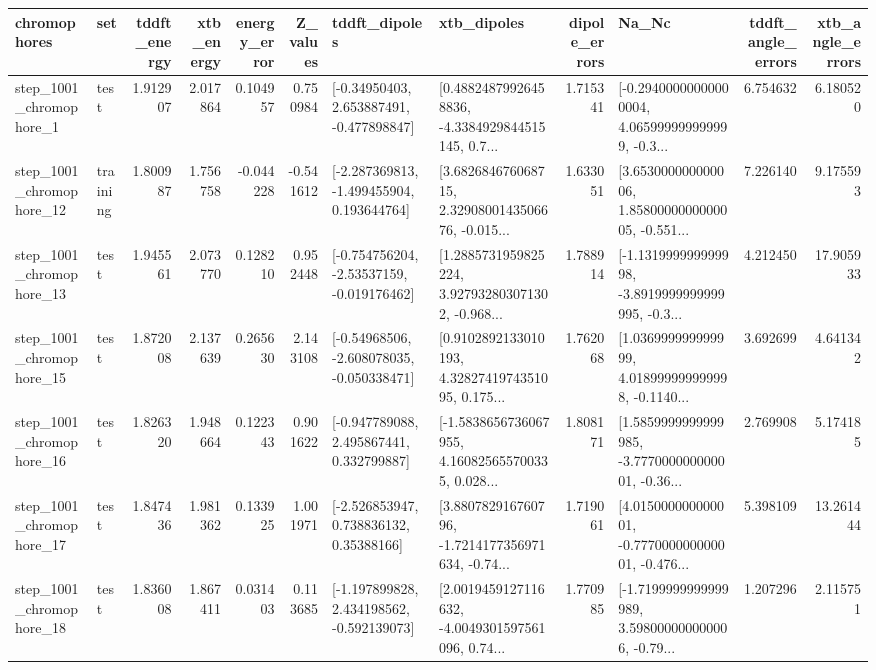 \begin{tabular}{llrrrrllrlrr}
\toprule
             chromophores &       set &  tddft\_energy &  xtb\_energy &  energy\_error &  Z\_values &                               tddft\_dipoles &                                        xtb\_dipoles &  dipole\_errors &                                              Na\_Nc &  tddft\_angle\_errors &  xtb\_angle\_errors \\
\midrule
  step\_1001\_chromophore\_1 &      test &      1.912907 &    2.017864 &      0.104957 &  0.750984 &    [-0.34950403, 2.653887491, -0.477898847] &  [0.48824879926458836, -4.3384929844515145, 0.7... &       1.715341 &  [-0.29400000000000004, 4.065999999999999, -0.3... &            6.754632 &          6.180520 \\
 step\_1001\_chromophore\_12 &  training &      1.800987 &    1.756758 &     -0.044228 & -0.541612 &   [-2.287369813, -1.499455904, 0.193644764] &  [3.682684676068715, 2.3290800143506676, -0.015... &       1.633051 &  [3.653000000000006, 1.8580000000000005, -0.551... &            7.226140 &          9.175593 \\
 step\_1001\_chromophore\_13 &      test &      1.945561 &    2.073770 &      0.128210 &  0.952448 &   [-0.754756204, -2.53537159, -0.019176462] &  [1.2885731959825224, 3.927932803071302, -0.968... &       1.788914 &  [-1.131999999999998, -3.8919999999999995, -0.3... &            4.212450 &         17.905933 \\
 step\_1001\_chromophore\_15 &      test &      1.872008 &    2.137639 &      0.265630 &  2.143108 &   [-0.54968506, -2.608078035, -0.050338471] &  [0.9102892133010193, 4.3282741974351095, 0.175... &       1.762068 &  [1.036999999999999, 4.018999999999998, -0.1140... &            3.692699 &          4.641342 \\
 step\_1001\_chromophore\_16 &      test &      1.826320 &    1.948664 &      0.122343 &  0.901622 &    [-0.947789088, 2.495867441, 0.332799887] &  [-1.5838656736067955, 4.160825655700335, 0.028... &       1.808171 &  [1.5859999999999985, -3.777000000000001, -0.36... &            2.769908 &          5.174185 \\
 step\_1001\_chromophore\_17 &      test &      1.847436 &    1.981362 &      0.133925 &  1.001971 &     [-2.526853947, 0.738836132, 0.35388166] &  [3.880782916760796, -1.7214177356971634, -0.74... &       1.719061 &  [4.015000000000001, -0.777000000000001, -0.476... &            5.398109 &         13.261444 \\
 step\_1001\_chromophore\_18 &      test &      1.836008 &    1.867411 &      0.031403 &  0.113685 &   [-1.197899828, 2.434198562, -0.592139073] &  [2.0019459127116632, -4.0049301597561096, 0.74... &       1.770985 &  [-1.7199999999999989, 3.598000000000006, -0.79... &            1.207296 &          2.115751 \\

\end{tabular}
